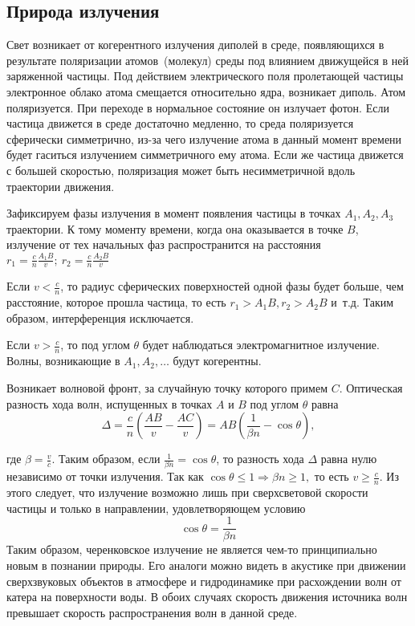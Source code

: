 \begin{main}
	 \subsection{Природа излучения}
	 \label{sec:subsection}
	 
	 Свет возникает от когерентного излучения диполей в среде, появляющихся в результате поляризации атомов~(молекул) среды под влиянием движущейся в ней заряженной частицы.
	 Под действием электрического поля пролетающей частицы электронное облако атома смещается относительно ядра, возникает диполь. Атом поляризуется. 
	 При переходе в нормальное состояние он излучает фотон. 
	 Если частица движется в среде достаточно медленно, то среда поляризуется сферически симметрично, из-за чего излучение атома в данный момент времени будет гаситься излучением симметричного ему атома.
	 Если же частица движется с большей скоростью, поляризация может быть несимметричной вдоль траектории движения.  
	 
	 Зафиксируем фазы излучения в момент появления частицы в точках $A_1, A_2, A_3$ траектории. 
	 К тому моменту времени, когда она оказывается в точке $B$, излучение от тех начальных фаз распространится на расстояния~$r_1 = \frac{c}{n} \frac{A_1B}{v};~r_2 = \frac{c}{n} \frac{A_2B}{v}$
	 
	 Если $v < \frac{c}{n}$, то радиус сферических поверхностей одной фазы будет больше, чем расстояние, которое прошла частица, то есть $r_1 > A_1B, r_2 > A_2B$ и~т.д. Таким образом, интерференция исключается.
	 
	 Если $v > \frac{c}{n}$, то под углом $\theta $ будет наблюдаться электромагнитное излучение. Волны, возникающие в $ A_1, A_2, \dots $ будут когерентны.
	 
	 Возникает волновой фронт, за случайную точку которого примем $ C $.
	 Оптическая разность хода волн, испущенных в точках $ A $ и $ B $ под углом $ \theta $ равна 
	 \begin{equation}
	 	\Delta = \frac{c}{n}(\frac{AB}{v} - \frac{AC}{v}) = AB(\frac{1}{\beta n} - \cos{\theta}), \label{dimension}
	 \end{equation}
	 
	 где $ \beta = \frac{v}{c} $.
	 Таким образом, если $ \frac{1}{\beta n} = \cos{\theta}$, то разность хода $\Delta $ равна нулю независимо от точки излучения. Так как $ \cos{\theta} \leq 1 \Rightarrow \beta n \geq 1, $ то есть $ v \geq \frac{c}{n} $. Из этого следует, что излучение возможно лишь при сверхсветовой скорости частицы и только в направлении, удовлетворяющем условию 
	 \begin{equation}
		\cos{\theta} = \frac{1}{\beta n}
		\label{costheta}
	 \end{equation}
	Таким образом, черенковское излучение не является чем-то принципиально новым в познании природы.
	Его аналоги можно видеть в акустике при движении сверхзвуковых объектов в атмосфере и гидродинамике при расхождении волн от катера на поверхности воды. В обоих случаях скорость движения источника волн превышает скорость распространения волн в данной среде.
	

\end{main}
